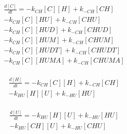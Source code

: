 \begin{equation}
\begin{split}
\frac{d[C]}{dt} =     - k_{CH}[C][H]    + k_{-CH}[CH]     \\%
                      - k_{CH}[C][HU]   + k_{-CH}[CHU]    \\%
                      - k_{CH}[C][HUD]  + k_{-CH}[CHUD]   \\%
                      - k_{CH}[C][HUM]  + k_{-CH}[CHUM]   \\%
                      - k_{CH}[C][HUDT] + k_{-CH}[CHUDT]  \\%
                      - k_{CH}[C][HUMA] + k_{-CH}[CHUMA]  \\%
\end{split}
\end{equation}

\begin{equation}
\begin{split}
\frac{d[H]}{dt} =     - k_{CH}[C][H]    + k_{-CH}[CH]     \\%
                      - k_{HU}[H][U]    + k_{-HU}[HU]     \\%
\end{split}
\end{equation}

\begin{equation}
\begin{split}
\frac{d[U]}{dt} =     - k_{HU}[H][U]    + k_{-HU}[HU]     \\%
                      - k_{HU}[CH][U]   + k_{-HU}[CHU]    \\%
\end{split}
\end{equation}

